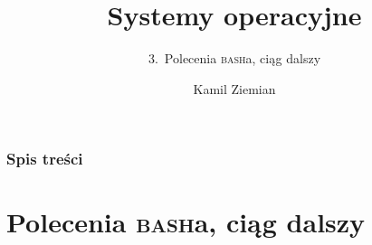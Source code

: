 \documentclass[10pt,t]{beamer}
\title{Systemy operacyjne}
\subtitle{3.~Polecenia \textsc{bash}a, ciąg dalszy}
\author{Kamil Ziemian \\
  \email}
\begin{document}





\RaggedRight





\maketitle





\begin{frame}
  \frametitle{Spis treści}


  \tableofcontents

\end{frame}




















\section{Polecenia \textsc{bash}a, ciąg dalszy}
\end{document}
